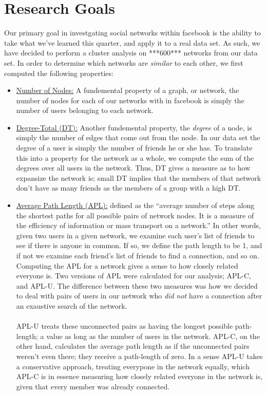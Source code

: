 \documentclass[fleqn]{article}
\begin{document}
\section{Research Goals}
Our primary goal in investgating social networks within facebook is the ability to take what we've learned this quarter, and apply it to a real data set. As such, we have decided to perform a cluster analysis on ***600*** networks from our data set. In order to determine which networks are \emph{similar} to each other, we first computed the following properties:
\begin{itemize}
\item \underline{Number of Nodes:} A fundemental property of a graph, or network, the number of nodes for each of our networks with in facebook is simply the number of users belonging to each network.  

\item \underline{Degree-Total (DT):} Another fundemental property, the \emph{degree} of a node, is simply the number of edges that come out from the node. In our data set the degree of a user is simply the number of friends he or she has. To translate this into a property for the network as a whole, we compute the sum of the degrees over all users in the network. Thus, DT gives a measure as to how expansize the network is; small DT implies that the members of that network don't have as many friends as the members of a group with a high DT.

\item \underline{Average Path Length (APL):} defined as the ``average number of steps along the shortest paths for all possible pairs of network nodes. It is a measure of the efficiency of information or mass transport on a network.'' In other words, given two users in a given network, we examine each user's list of friends to see if there is anyone in common. If so, we define the path length to be 1, and if not we examine each friend's list of friends to find a connection, and so on. Computing the APL for a network gives a sense to how closely related everyone is. Two versions of APL were calculated for our analysis; APL-C, and APL-U. The difference between these two measures was how we decided to deal with pairs of users in our network who \emph{did not} have a connection after an exaustive search of the network. \\ \\
APL-U treats these unconnected pairs as having the longest possible path-length; a value as long as the number of users in the network. APL-C, on the other hand, calculates the average path length as if the unconnected pairs weren't even there; they receive a path-length of zero. In a sense APL-U takes a conservative approach, treating everypone in the network equally, which APL-C is in essence measuring how closely related everyone in the network is, given that every member was already connected. 


\end{itemize}
\end{document}
